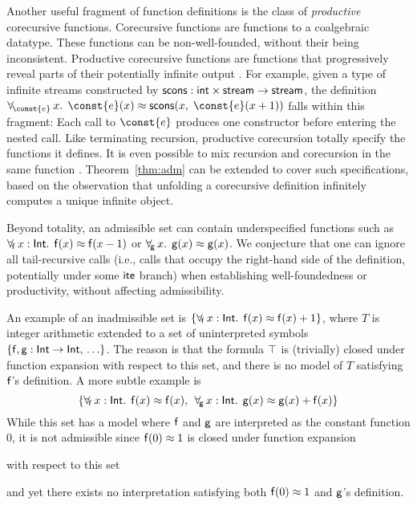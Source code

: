 \begin{rep}
Another useful fragment of function definitions is the class of
\emph{productive} corecursive functions. Corecursive functions are functions to
a coalgebraic datatype. These functions can be non-well-founded, without
their being inconsistent. Productive corecursive functions are functions that
progressively reveal parts of their potentially infinite
output \cite{turner-1995,mcbride-productive}.
For example, given a type of infinite streams constructed by
$\mathsf{scons} : \mathsf{int} \times \mathsf{stream} \to \mathsf{stream}$,
the definition
$\forallf{\const{e}} x.\;\, \const{e}(x) \teq \con{scons}(x,\; \const{e}(x + 1))$
falls within this fragment: Each call to $\const{e}$ produces one
constructor before entering the nested call. Like terminating recursion,
productive corecursion totally specify the functions it defines.
It is even possible to mix recursion and corecursion in the same function
\cite{blanchette-et-al-2015-fouco}. Theorem~\ref{thm:adm} can be extended to
cover such specifications, based on the observation that unfolding
a corecursive definition infinitely computes a unique infinite object.

Beyond totality, an admissible set can contain underspecified functions
such as $\forall_{\!\mathsf{f}\:} x : \mathsf{Int}.\allowbreak\;\, \mathsf{f}( x )
\approx \mathsf{f}( x - 1 )$ or $\forall_{\!\mathsf{g}\:} x.\allowbreak\;\, \mathsf{g}( x
) \approx \mathsf{g}( x )$. We conjecture that one can ignore all
tail-recursive calls (i.e., calls that occupy the right-hand side of the
definition, potentially under some $\mathsf{ite}$ branch) when establishing well-foundedness
or productivity, without affecting admissibility.
\end{rep}

\newcommand\badassex{
 \{\forallf{\con{f}} x : \typeint.\;\, \con{f}( x ) \teq \con{f}( x ),\allowbreak\;\,
 \forallf{\con{g}} x : \typeint.\;\, \con{g}( x ) \teq \con{g}( x ) + \nobreak\con{f}( x )\}}

An example of an inadmissible set is
$\{ \forall_{\!\mathsf{f}\:} x : \mathsf{Int}.\;\, \mathsf{f}( x ) \approx \mathsf{f}( x ) + 1 \}$,
where $T$ is integer arithmetic extended to a set of uninterpreted symbols 
$\{\mathsf{f}, \mathsf{g} :\mathsf{Int} \rightarrow \mathsf{Int},\, \ldots \}$.
The reason is that the formula $\top$ is (trivially) closed under function expansion with respect to this set,
and there is no model of $T$
satisfying $\mathsf{f}$'s definition. A more subtle example is
\[\badassex\]
While this set has a model where $\mathsf{f}$ and $\mathsf{g}$ are interpreted as the
constant function $0$, it is not admissible since %
$\mathsf{f}( 0 ) \approx 1$ is
closed under function expansion \begin{rep}with respect to this set\end{rep}
and yet there exists
no interpretation satisfying both $\mathsf{f}( 0 ) \approx 1$ and $\mathsf{g}$'s
definition.

